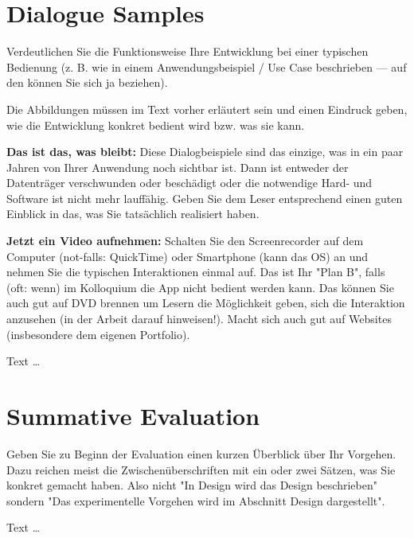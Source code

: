 \documentclass[11pt,a4paper,english]{scrreprt}
\newenvironment{comment}
  {\par\medskip
   \begingroup\color{olive}%
   }
 {\endgroup
  \medskip}
\begin{document}
\chapter{Dialogue Samples}
\begin{comment}
Verdeutlichen Sie die Funktionsweise Ihre Entwicklung bei einer typischen Bedienung (z. B. wie in einem Anwendungsbeispiel / Use Case beschrieben — auf den können Sie sich ja beziehen).

Die Abbildungen müssen im Text vorher erläutert sein und einen Eindruck geben, wie die Entwicklung konkret bedient wird bzw. was sie kann.

\textbf{Das ist das, was bleibt:} Diese Dialogbeispiele sind das einzige, was in ein paar Jahren von Ihrer Anwendung noch sichtbar ist. Dann ist entweder der Datenträger verschwunden oder beschädigt oder die notwendige Hard- und Software ist nicht mehr lauffähig. Geben Sie dem Leser entsprechend einen guten Einblick in das, was Sie tatsächlich realisiert haben.

\textbf{Jetzt ein Video aufnehmen:} Schalten Sie den Screenrecorder auf dem Computer (not-falls: QuickTime) oder Smartphone (kann das OS) an und nehmen Sie die typischen Interaktionen einmal auf. Das ist Ihr "Plan B", falls (oft: wenn) im Kolloquium die App nicht bedient werden kann. Das können Sie auch gut auf DVD brennen um Lesern die Möglichkeit geben, sich die Interaktion anzusehen (in der Arbeit darauf hinweisen!). Macht sich auch gut auf Websites (insbesondere dem eigenen Portfolio).
\end{comment}

Text \dots

\newpage
\chapter{Summative Evaluation}
\begin{comment}
Geben Sie zu Beginn der Evaluation einen kurzen Überblick über Ihr Vorgehen. Dazu reichen meist die Zwischenüberschriften mit ein oder zwei Sätzen, was Sie konkret gemacht haben. Also nicht "In Design wird das Design beschrieben" sondern "Das experimentelle Vorgehen wird im Abschnitt Design dargestellt".
\end{comment}

Text \dots
\end{document}
